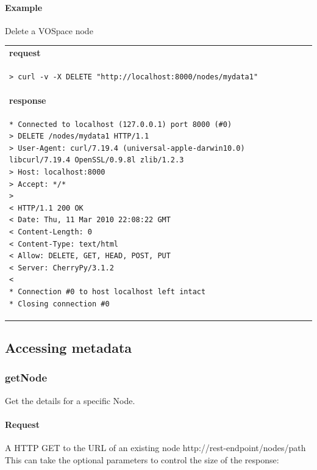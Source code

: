 \documentclass[11pt,a4paper]{ivoa}
\begin{document}
\paragraph{Example}
Delete a VOSpace node

\begin{tabular}{ p{10cm} }
\\
\textbf{request} \\
\begin{lstlisting}
> curl -v -X DELETE "http://localhost:8000/nodes/mydata1"
\end{lstlisting} \\
\textbf{response} \\
\begin{lstlisting}
* Connected to localhost (127.0.0.1) port 8000 (#0)
> DELETE /nodes/mydata1 HTTP/1.1
> User-Agent: curl/7.19.4 (universal-apple-darwin10.0) libcurl/7.19.4 OpenSSL/0.9.8l zlib/1.2.3
> Host: localhost:8000
> Accept: */*
> 
< HTTP/1.1 200 OK
< Date: Thu, 11 Mar 2010 22:08:22 GMT
< Content-Length: 0
< Content-Type: text/html
< Allow: DELETE, GET, HEAD, POST, PUT
< Server: CherryPy/3.1.2
< 
* Connection #0 to host localhost left intact
* Closing connection #0
\end{lstlisting}
\end{tabular}

\subsection{Accessing metadata}

\subsubsection{getNode}
Get the details for a specific Node.

\paragraph{Request}
A HTTP GET to the URL of an existing node http://rest-endpoint/nodes/path
This can take the optional parameters to control the size of the response:
\end{document}
